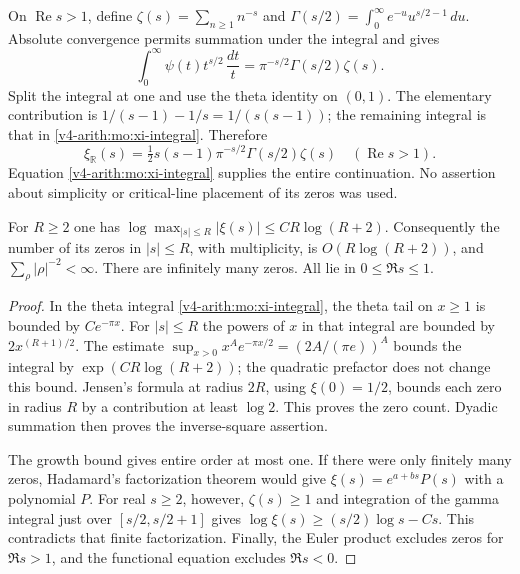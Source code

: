 On $\operatorname{Re}s>1$, define
$\zeta(s)=\sum_{n\geq1}n^{-s}$ and
$\Gamma(s/2)=\int_0^\infty e^{-u}u^{s/2-1}\,du$.
Absolute convergence permits summation under the integral and gives
\[
 \int_0^\infty\psi(t)t^{s/2}\,\frac{dt}{t}
       =\pi^{-s/2}\Gamma(s/2)\zeta(s).
\]
Split the integral at one and use the theta identity on $(0,1)$.
The elementary contribution is
$1/(s-1)-1/s=1/(s(s-1))$; the remaining integral is that in
\eqref{v4-arith:mo:xi-integral}. Therefore
\[
 \xi_{\mathbb R}(s)=
 \tfrac12s(s-1)\pi^{-s/2}\Gamma(s/2)\zeta(s)
 \quad(\operatorname{Re}s>1).
\]
Equation \eqref{v4-arith:mo:xi-integral} supplies the entire continuation.
No assertion about simplicity or critical-line placement of its
zeros was used.

\begin{lemma}
\label{v4-arith:pm:zero-count}
For $R\geq2$ one has
$\log\max_{|s|\leq R}|\xi(s)|\leq CR\log(R+2)$.
Consequently the number of its zeros in $|s|\leq R$, with
multiplicity, is $O(R\log(R+2))$, and
$\sum_\rho|\rho|^{-2}<\infty$.
There are infinitely many zeros. All lie in $0\leq\Re s\leq1$.
\end{lemma}
\begin{proof}
In the theta integral \eqref{v4-arith:mo:xi-integral}, the theta
tail on $x\geq1$ is bounded by $C e^{-\pi x}$. For $|s|\leq R$
the powers of $x$ in that integral are bounded by $2x^{(R+1)/2}$.
The estimate
$\sup_{x>0}x^A e^{-\pi x/2}=(2A/(\pi e))^A$
bounds the integral by $\exp(CR\log(R+2))$; the quadratic
prefactor does not change this bound. Jensen's formula at radius
$2R$, using $\xi(0)=1/2$, bounds each zero in radius $R$ by a
contribution at least $\log2$. This proves the zero count.
Dyadic summation then proves the inverse-square assertion.

The growth bound gives entire order at most one. If there were
only finitely many zeros, Hadamard's factorization theorem would
give $\xi(s)=e^{a+bs}P(s)$ with a polynomial $P$.
For real $s\geq2$, however, $\zeta(s)\geq1$ and integration of
the gamma integral just over $[s/2,s/2+1]$ gives
$\log\xi(s)\geq(s/2)\log s-Cs$. This contradicts that finite
factorization. Finally, the Euler product excludes zeros for
$\Re s>1$, and the functional equation excludes $\Re s<0$.
\end{proof}

